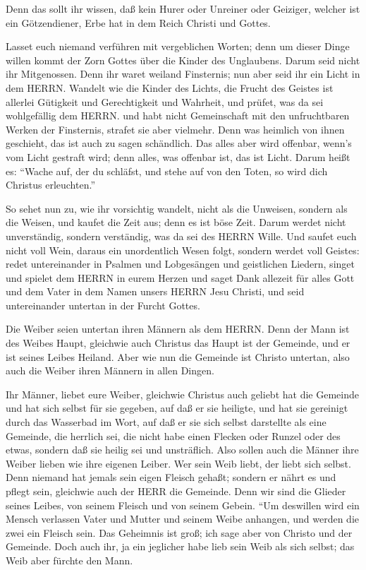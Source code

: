  Denn das sollt ihr wissen, daß kein Hurer oder Unreiner
oder Geiziger, welcher ist ein Götzendiener, Erbe hat in dem Reich
Christi und Gottes.

 Lasset euch niemand verführen mit vergeblichen Worten; denn
um dieser Dinge willen kommt der Zorn Gottes über die Kinder des
Unglaubens.  Darum seid nicht ihr Mitgenossen. 
Denn ihr waret weiland Finsternis; nun aber seid ihr ein Licht in dem
HERRN.  Wandelt wie die Kinder des Lichts, die Frucht des
Geistes ist allerlei Gütigkeit und Gerechtigkeit und Wahrheit,
 und prüfet, was da sei wohlgefällig dem HERRN.
 und habt nicht Gemeinschaft mit den unfruchtbaren Werken
der Finsternis, strafet sie aber vielmehr.  Denn was
heimlich von ihnen geschieht, das ist auch zu sagen schändlich.
 Das alles aber wird offenbar, wenn's vom Licht gestraft
wird; denn alles, was offenbar ist, das ist Licht.  Darum
heißt es: ``Wache auf, der du schläfst, und stehe auf von den Toten, so
wird dich Christus erleuchten.''

 So sehet nun zu, wie ihr vorsichtig wandelt, nicht als die
Unweisen, sondern als die Weisen,  und kaufet die Zeit aus;
denn es ist böse Zeit.  Darum werdet nicht unverständig,
sondern verständig, was da sei des HERRN Wille.  Und saufet
euch nicht voll Wein, daraus ein unordentlich Wesen folgt, sondern
werdet voll Geistes:  redet untereinander in Psalmen und
Lobgesängen und geistlichen Liedern, singet und spielet dem HERRN in
eurem Herzen  und saget Dank allezeit für alles Gott und
dem Vater in dem Namen unsers HERRN Jesu Christi,  und seid
untereinander untertan in der Furcht Gottes.

 Die Weiber seien untertan ihren Männern als dem HERRN.
 Denn der Mann ist des Weibes Haupt, gleichwie auch
Christus das Haupt ist der Gemeinde, und er ist seines Leibes Heiland.
 Aber wie nun die Gemeinde ist Christo untertan, also auch
die Weiber ihren Männern in allen Dingen.

 Ihr Männer, liebet eure Weiber, gleichwie Christus auch
geliebt hat die Gemeinde und hat sich selbst für sie gegeben,
 auf daß er sie heiligte, und hat sie gereinigt durch das
Wasserbad im Wort,  auf daß er sie sich selbst darstellte
als eine Gemeinde, die herrlich sei, die nicht habe einen Flecken oder
Runzel oder des etwas, sondern daß sie heilig sei und unsträflich.
 Also sollen auch die Männer ihre Weiber lieben wie ihre
eigenen Leiber. Wer sein Weib liebt, der liebt sich selbst.
 Denn niemand hat jemals sein eigen Fleisch gehaßt; sondern
er nährt es und pflegt sein, gleichwie auch der HERR die Gemeinde.
 Denn wir sind die Glieder seines Leibes, von seinem
Fleisch und von seinem Gebein.  ``Um deswillen wird ein
Mensch verlassen Vater und Mutter und seinem Weibe anhangen, und werden
die zwei ein Fleisch sein.  Das Geheimnis ist groß; ich
sage aber von Christo und der Gemeinde.  Doch auch ihr, ja
ein jeglicher habe lieb sein Weib als sich selbst; das Weib aber fürchte
den Mann.

